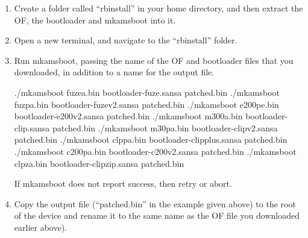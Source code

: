 \begin{enumerate}

\item Create a folder called ``rbinstall'' in your home directory, and then
  extract the OF, the bootloader and mkamsboot into it.

\item Open a new terminal, and navigate to the ``rbinstall'' folder.

\item Run mkamsboot, passing the name of the OF and bootloader files that
  you downloaded, in addition to a name for the output file.

  \begin{code}[firstline=\opt{fuze}{1}\opt{fuzev2}{2}\opt{e200v2}{3}%
            \opt{clipv1}{4}\opt{clipv2}{5}\opt{clipplus}{6}\opt{c200v2}{7}%
            \opt{clipzip}{8},%
               lastline=\opt{fuze}{1}\opt{fuzev2}{2}\opt{e200v2}{3}%
            \opt{clipv1}{4}\opt{clipv2}{5}\opt{clipplus}{6}\opt{c200v2}{7}%
            \opt{clipzip}{8}]
    ./mkamsboot fuzea.bin bootloader-fuze.sansa patched.bin
    ./mkamsboot fuzpa.bin bootloader-fuzev2.sansa patched.bin
    ./mkamsboot e200pe.bin bootloader-e200v2.sansa patched.bin
    ./mkamsboot m300a.bin bootloader-clip.sansa patched.bin
    ./mkamsboot m30pa.bin bootloader-clipv2.sansa patched.bin
    ./mkamsboot clppa.bin bootloader-clipplus.sansa patched.bin
    ./mkamsboot c200pa.bin bootloader-c200v2.sansa patched.bin
    ./mkamsboot clpza.bin bootloader-clipzip.sansa patched.bin
  \end{code}
 
  If mkamsboot does not report success, then retry or abort.

\item Copy the output file (``patched.bin'' in the example given above) to the
  root of the device and rename it to the same name as the OF file you downloaded earlier 
   
   
   
    above).
\end{enumerate}
